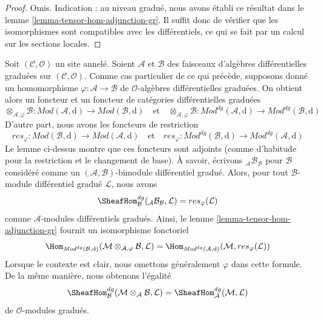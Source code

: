 \begin{proof}
Omis. Indication : au niveau gradué, nous avons établi ce résultat
dans le lemme \ref{lemma-tensor-hom-adjunction-gr}. Il suffit
donc de vérifier que les isomorphismes sont compatibles avec les
différentiels, ce qui se fait par un calcul sur les sections locales.
\end{proof}

\noindent
Soit $(\mathcal{C}, \mathcal{O})$ un site annelé. Soient $\mathcal{A}$
et $\mathcal{B}$ des faisceaux d'algèbres différentielles graduées
sur $(\mathcal{C}, \mathcal{O})$.
Comme cas particulier de ce qui précède, supposons
donné un homomorphisme $\varphi : \mathcal{A} \to \mathcal{B}$
de $\mathcal{O}$-algèbres différentielles graduées. On obtient alors
un foncteur et un foncteur de catégories différentielles
graduées $$
\otimes_{\mathcal{A}, \varphi} \mathcal{B}
: \textit{Mod}(\mathcal{A}, \text{d})
\longrightarrow
\textit{Mod}(\mathcal{B}, \text{d})
\quad\text{et}\quad
\otimes_{\mathcal{A}, \varphi} \mathcal{B}
: \textit{Mod}^{dg}(\mathcal{A}, \text{d})
\longrightarrow
\textit{Mod}^{dg}(\mathcal{B}, \text{d})
$$
D'autre part, nous avons les foncteurs de
restriction $$
res_\varphi
: \textit{Mod}(\mathcal{B}, \text{d})
\longrightarrow
\textit{Mod}(\mathcal{A}, \text{d})
\quad\text{et}\quad
res_\varphi
: \textit{Mod}^{dg}(\mathcal{B}, \text{d})
\longrightarrow
\textit{Mod}^{dg}(\mathcal{A}, \text{d})
$$
Le lemme ci-dessus montre que ces foncteurs sont adjoints
(comme d'habitude pour la restriction et le changement de base).
À savoir, écrivons ${}_\mathcal{A}\mathcal{B}_\mathcal{B}$
pour $\mathcal{B}$ considéré comme un
$(\mathcal{A}, \mathcal{B})$-bimodule différentiel
gradué. Alors, pour tout $\mathcal{B}$-module différentiel gradué $\mathcal{L}$,
nous
avons $$
\SheafHom_\mathcal{B}^{dg}({}_\mathcal{A}\mathcal{B}_\mathcal{B}, \mathcal{L})
= res_\varphi(\mathcal{L})
$$
comme $\mathcal{A}$-modules différentiels
gradués. Ainsi, le lemme \ref{lemma-tensor-hom-adjunction-gr}
fournit un isomorphisme
fonctoriel $$
\Hom_{\textit{Mod}^{dg}(\mathcal{B}, \text{d})}(
\mathcal{M} \otimes_{\mathcal{A}, \varphi} \mathcal{B}, \mathcal{L})
= \Hom_{\textit{Mod}^{dg}(\mathcal{A}, \text{d})}(
\mathcal{M}, res_\varphi(\mathcal{L}))
$$
Lorsque le contexte est clair, nous omettons généralement $\varphi$
dans cette formule. De la même manière, nous obtenons
l'égalité
$$
\SheafHom^{dg}_\mathcal{B}(
\mathcal{M} \otimes_\mathcal{A} \mathcal{B}, \mathcal{L}) =
\SheafHom_\mathcal{A}^{dg}(\mathcal{M}, \mathcal{L})
$$
de $\mathcal{O}$-modules gradués.












